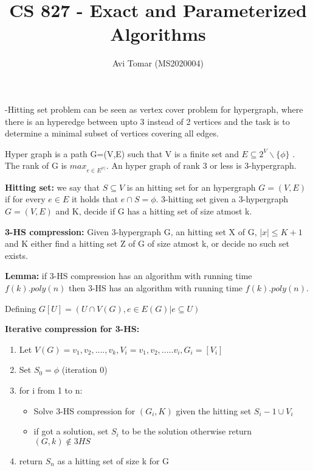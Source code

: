 \documentclass{homeworg}
\title{CS 827 - Exact and Parameterized Algorithms}
\author{Avi Tomar (MS2020004)}
\begin{document}
\maketitle

-Hitting set problem can be seen as vertex cover problem for hypergraph, where there is an hyperedge between upto 3 instead of 2 vertices and the task is to determine a minimal subset of vertices covering all edges.

Hyper graph is a path G=(V,E) such that V is a finite set and $E \subseteq 2^V \backslash \{ \phi \}$ . The rank of G is $max_{e \in E^|e|}$. An hyper graph of rank 3 or less is 3-hypergraph.

\textbf{Hitting set:} we say that $S \subseteq V$ is an hitting set for an hypergraph $G=(V,E)$ if for every $e \in E$ it holds that $ e \cap S = \phi$.
3-hitting set given a 3-hypergraph $G=(V,E)$ and K, decide if G has a hitting set of size atmost k.

\textbf{3-HS compression:} Given 3-hypergraph G, an hitting set X of G, $|x| \leq K+1$ and K either find a hitting set Z of G of size atmost k, or decide no such set exists.

\textbf{Lemma:} if 3-HS compression has an algorithm with running time $f(k).poly(n)$ then 3-HS has an algorithm with running time $f(k).poly(n)$.

Defining $G[U]=(U \cap V(G), {e \in E(G) |  e \subseteq U})$

\textbf{Iterative compression for 3-HS:}
\begin{enumerate}
    \item Let $V(G)={v_1,v_2,....,v_k}, V_i={v_1,v_2,.....v_i},  G_i=[V_i]$
    \item Set $S_0=\phi$ (iteration 0)

\item for i from 1 to n:
\begin{itemize}
    \item Solve 3-HS compression for $(G_i,K)$ given the hitting set $S_i-1 \cup V_i$

    \item if got a solution, set $S_i$ to be the solution otherwise return $(G,k) \notin 3HS$
\end{itemize}
    

\item return $S_n$ as a hitting set of size k for G
\end{enumerate}
\end{document}
